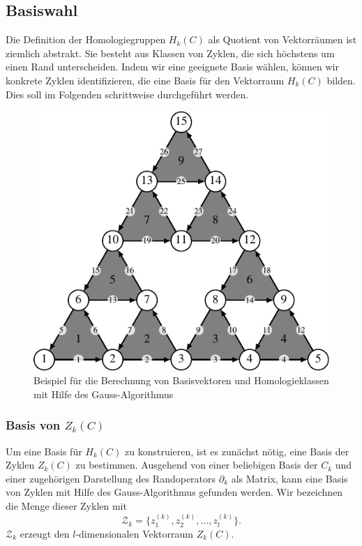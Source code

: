 \subsection{Basiswahl
\label{buch:subsection:basiswahl}}
Die Definition der Homologiegruppen $H_k(C)$ als Quotient von
Vektorräumen ist ziemlich abstrakt.
Sie besteht aus Klassen von Zyklen, die sich höchstens um einen
Rand unterscheiden.
Indem wir eine geeignete Basis wählen, können wir konkrete Zyklen
identifizieren, die eine Basis für den Vektorraum $H_k(C)$ bilden.
Dies soll im Folgenden schrittweise durchgeführt werden.

\begin{figure}
\centering
\includegraphics{chapters/95-homologie/images/gausshomoex.pdf}
\caption{Beispiel für die Berechnung von Basisvektoren und Homologieklassen
mit Hilfe des Gauss-Algorithmus
\label{buch:homologie:fig:gausshomoex}}
\end{figure}

\subsubsection{Basis von $Z_k(C)$}
Um eine Basis für $H_k(C)$ zu konstruieren, ist es zunächst nötig,
eine Basis der Zyklen $Z_k(C)$ zu bestimmen.
Ausgehend von einer beliebigen Basis der $C_k$ und einer 
zugehörigen Darstellung des Randoperators $\partial_k$ als
Matrix, kann eine Basis von Zyklen mit Hilfe des Gauss-Algorithmus
gefunden werden.
Wir bezeichnen die Menge dieser Zyklen mit
\[
\mathcal{Z}_k 
=
\{
z_1^{(k)},
z_2^{(k)},
\dots,
z_l^{(k)}
\}.
\]
$\mathcal{Z}_k$ erzeugt den $l$-dimensionalen Vektorraum $Z_k(C)$.

